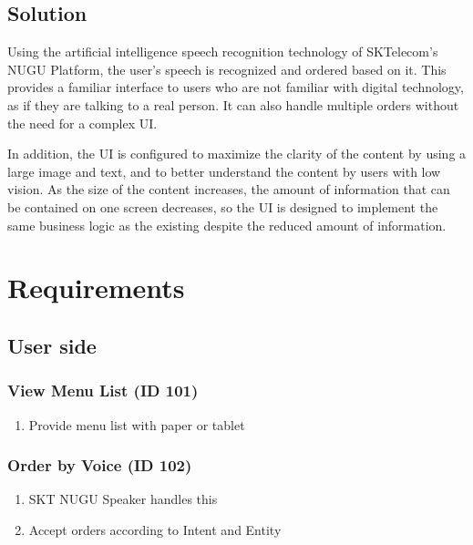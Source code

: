 \documentclass[conference,compsoc]{IEEEtran}
\begin{document}
\subsection{Solution}
Using the artificial intelligence speech recognition technology of SKTelecom's NUGU Platform, the user's speech is recognized and ordered based on it. This provides a familiar interface to users who are not familiar with digital technology, as if they are talking to a real person. It can also handle multiple orders without the need for a complex UI.

In addition, the UI is configured to maximize the clarity of the content by using a large image and text, and to better understand the content by users with low vision. As the size of the content increases, the amount of information that can be contained on one screen decreases, so the UI is designed to implement the same business logic as the existing despite the reduced amount of information.

\section{Requirements}

\subsection{User side}

\subsubsection{View Menu List (ID 101)}
\begin{enumerate}
  \item Provide menu list with paper or tablet
\end{enumerate}

\subsubsection{Order by Voice (ID 102)}
\begin{enumerate}
  \item SKT NUGU Speaker handles this
  \item Accept orders according to Intent and Entity
\end{enumerate}
\end{document}

